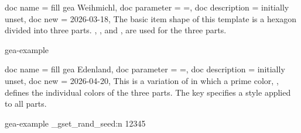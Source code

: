 \documentclass[a4paper,11pt]{article}
\begin{document}
\begin{docTikzKeys}
  {
    {
      doc name        = fill gea Weihmichl,
      doc parameter   = {=},
      doc description = {initially unset},
      doc new         = 2026-03-18,
    }
  }
  The basic item shape of this template is a hexagon divided into three parts.
  ,
  , and
  , are used for the three parts.
\begin{dispExample*}{gea-example}
\end{dispExample*}
\end{docTikzKeys}


\begin{docTikzKeys}
  {
    {
      doc name        = fill gea Edenland,
      doc parameter   = {=},
      doc description = {initially unset},
      doc new         = 2026-04-20,
    }
  }
  This is a variation of  in which a
  prime color, , defines
  the individual colors of the three parts. The key 
  specifies a style applied to all parts.
\begin{dispExample*}{gea-example}
\ExplSyntaxOn
\sys_gset_rand_seed:n {12345}
\ExplSyntaxOff
{}
\end{dispExample*}
\end{docTikzKeys}



\clearpage
\end{document}
